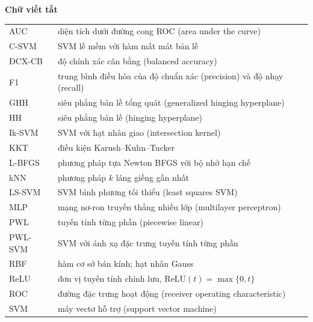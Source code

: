 \bigskip
\noindent\textbf{Chữ viết tắt}

\smallskip
\noindent\begin{tabularx}{\linewidth}{@{}p{3.1cm}X@{}}
AUC & diện tích dưới đường cong ROC (area under the curve)\\
C-SVM & SVM lề mềm với hàm mất mát bản lề\\
ĐCX-CB & độ chính xác cân bằng (balanced accuracy)\\
F1 & trung bình điều hòa của độ chuẩn xác (precision) và độ nhạy (recall)\\
GHH & siêu phẳng bản lề tổng quát (generalized hinging hyperplane)\\
HH & siêu phẳng bản lề (hinging hyperplane)\\
Ik-SVM & SVM với hạt nhân giao (intersection kernel)\\
KKT & điều kiện Karush--Kuhn--Tucker\\
L-BFGS & phương pháp tựa Newton BFGS với bộ nhớ hạn chế\\
kNN & phương pháp $k$ láng giềng gần nhất\\
LS-SVM & SVM bình phương tối thiểu (least squares SVM)\\
MLP & mạng nơ-ron truyền thẳng nhiều lớp (multilayer perceptron)\\
PWL & tuyến tính từng phần (piecewise linear)\\
PWL-SVM & SVM với ánh xạ đặc trưng tuyến tính từng phần\\
RBF & hàm cơ sở bán kính; hạt nhân Gauss\\
ReLU & đơn vị tuyến tính chỉnh lưu, $\mathrm{ReLU}(t)=\max\{0,t\}$\\
ROC & đường đặc trưng hoạt động (receiver operating characteristic)\\
SVM & máy vectơ hỗ trợ (support vector machine)\\
\end{tabularx}
\endgroup
